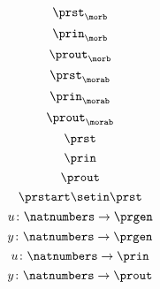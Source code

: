 {\begin{forslides}
    \begin{equation}
        \label{eq:morb-prst}
        \prst_{\morb}
    \end{equation}
    \begin{equation}
        \label{eq:morb-prin}
        \prin_{\morb}
    \end{equation}
    \begin{equation}
        \label{eq:morb-prout}
        \prout_{\morb}
    \end{equation}
    \begin{equation}
        \label{eq:morab-prst}
        \prst_{\morab}
    \end{equation}
    \begin{equation}
        \label{eq:morab-prin}
        \prin_{\morab}
    \end{equation}
    \begin{equation}
        \label{eq:morab-prout}
        \prout_{\morab}
    \end{equation}
    \begin{equation}
        \label{eq:gen-prst}
        \prst
    \end{equation}
    \begin{equation}
        \label{eq:gen-prin}
        \prin
    \end{equation}
    \begin{equation}
        \label{eq:gen-prout}
        \prout
    \end{equation}
    \begin{equation}
        \label{eq:moore-start}
        \prstart \setin \prst
    \end{equation}
    \begin{equation}
        \label{eq:prgen-u}
        u\colon \natnumbers \to \prgen
    \end{equation}
    \begin{equation}
        \label{eq:prgen-y}
        y\colon \natnumbers \to \prgen
    \end{equation}
    \begin{equation}
        \label{eq:prgen-u-1}
        u\colon \natnumbers \to \prin
    \end{equation}
    \begin{equation}
        \label{eq:prgen-y-1}
        y\colon \natnumbers \to \prout
    \end{equation}
    \begin{equation}
        \label{eq:prgen-u-2}

\end{equation}
\end{forslides}}
